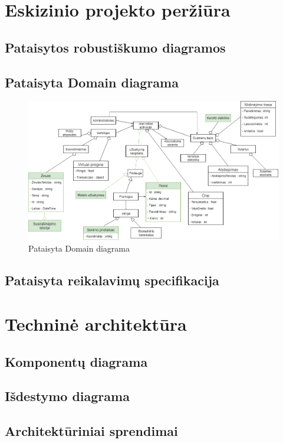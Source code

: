 \documentclass[oneside]{VUMIFPSkursinis}
\begin{document}
\section{Eskizinio projekto peržiūra}
\subsection{Pataisytos robustiškumo diagramos}
\subsection{Pataisyta Domain diagrama}
\begin{figure}[h]
    \centering
    \includegraphics[width=1.0\textwidth]{domainfixed.png}
    \caption{Pataisyta Domain diagrama}
    \label{fig:domainfixed}
\end{figure}
\vskip 1cm
\subsection{Pataisyta reikalavimų specifikacija}

\section{Techninė architektūra}

\subsection{Komponentų diagrama}
\subsection{Išdestymo diagrama}
\subsection{Architektūriniai sprendimai}
\end{document}
